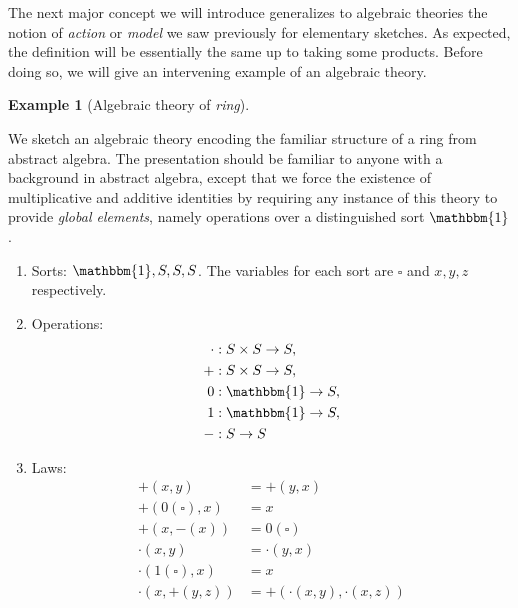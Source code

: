 \documentclass[12pt,twoside]{reedthesis}
\theoremstyle{definition}
\newtheorem{example}{Example}
\theoremstyle{remark}
\theoremstyle{plain}
\begin{document}
The next major concept we will introduce generalizes to algebraic theories the
notion of \emph{action} or \emph{model} we saw previously for elementary
sketches. As expected, the definition will be essentially the same up to taking
some products. Before doing so, we will give an intervening example of an
algebraic theory.
\begin{example}[Algebraic theory of \emph{ring}]\label{ex:theory of ring}

  We sketch an algebraic theory encoding the familiar structure of a ring from
  abstract algebra. The presentation should be familiar to anyone with a
  background in abstract algebra, except that we force the existence of
  multiplicative and additive identities by requiring any instance of this
  theory to provide \emph{global elements}, namely operations over a
  distinguished sort $\mathbbm{1}$.
  \begin{enumerate}
    \item Sorts: \( \mathbbm{1}, S, S, S \). The variables for each sort are
          \( \square \) and \( x, y, z\) respectively.

    \item Operations: \begin{align*}
                        \cdot &: S \times S \rightarrow S, \\
                        + &: S \times S \rightarrow S,\\
                        0 &: \mathbbm{1} \rightarrow S,\\
                        1 &: \mathbbm{1} \rightarrow S,\\
                        - &: S \rightarrow S
                      \end{align*}

    \item Laws: \begin{align*}
                  +(x,y) &= +(y,x)\\
                  +(0(\square), x) &= x\\
                  +(x, -(x)) &= 0(\square)\\
                  \cdot(x,y) &= \cdot(y,x)\\
                  \cdot(1(\square), x) &= x\\
                  \cdot(x, +(y,z)) &= +(\cdot(x,y), \cdot(x,z))
                \end{align*}
  \end{enumerate}
\end{example}
\end{document}

